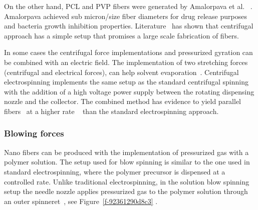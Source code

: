 \documentclass[5p,,preprint,12pt,twocolumn]{elsarticle}
\begin{document}
On the other hand, PCL and PVP fibers were generated by Amalorpava et al. \unskip~\cite{527120:13536089}.  Amalorpava achieved sub micron/size fiber diameters for drug release purposes and bacteria growth inhibition properties. Literature\unskip~\cite{527120:13536446} has shown that centrifugal approach has a simple setup that promises a large scale fabrication of fibers.

In some cases the centrifugal force implementations and pressurized gyration can be combined with an electric field. The implementation of two stretching forces (centrifugal and electrical forces), can help solvent evaporation\unskip~\cite{527120:13536560}. Centrifugal electrospinning implements the same setup as the standard centrifugal spinning with the addition of a high voltage power supply between the rotating dispensing nozzle and the collector. The combined method has evidence to yield parallel fibers\unskip~\cite{527120:13536841,527120:13536900,527120:13537392,527120:13537393} at a higher rate \unskip~\cite{527120:13536841,527120:13536900} than the standard electrospinning approach.



\subsubsection{Blowing forces}Nano fibers can be produced with the implementation of pressurized gas with a polymer solution. The setup used for blow spinning is similar to the one used in standard electrospinning, where the polymer precursor is dispensed at a controlled rate. Unlike traditional electrospinning, in the solution blow spinning setup the needle nozzle applies pressurized gas to the polymer solution through an outer spinneret\unskip~\cite{527120:13538056}, see Figure~\ref{f-92361290d8c3} . 
\end{document}
